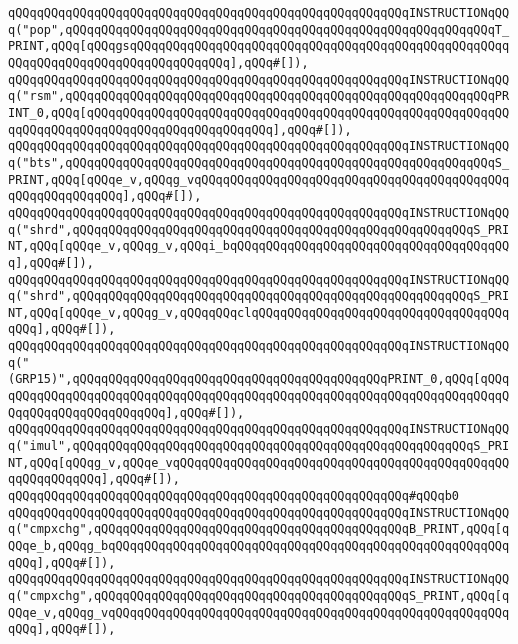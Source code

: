 \verb|qQQqqQQqqQQqqQQqqQQqqQQqqQQqqQQqqQQqqQQqqQQqqQQqqQQqqQQqINSTRUCTIONqQQq("pop",qQQqqQQqqQQqqQQqqQQqqQQqqQQqqQQqqQQqqQQqqQQqqQQqqQQqqQQqqQQqT_PRINT,qQQq[qQQqgsqQQqqQQqqQQqqQQqqQQqqQQqqQQqqQQqqQQqqQQqqQQqqQQqqQQqqQQqqQQqqQQqqQQqqQQqqQQqqQQqqQQq],qQQq#[]),|\newline
\verb|qQQqqQQqqQQqqQQqqQQqqQQqqQQqqQQqqQQqqQQqqQQqqQQqqQQqqQQqINSTRUCTIONqQQq("rsm",qQQqqQQqqQQqqQQqqQQqqQQqqQQqqQQqqQQqqQQqqQQqqQQqqQQqqQQqqQQqPRINT_0,qQQq[qQQqqQQqqQQqqQQqqQQqqQQqqQQqqQQqqQQqqQQqqQQqqQQqqQQqqQQqqQQqqQQqqQQqqQQqqQQqqQQqqQQqqQQqqQQqqQQq],qQQq#[]),|\newline
\verb|qQQqqQQqqQQqqQQqqQQqqQQqqQQqqQQqqQQqqQQqqQQqqQQqqQQqqQQqINSTRUCTIONqQQq("bts",qQQqqQQqqQQqqQQqqQQqqQQqqQQqqQQqqQQqqQQqqQQqqQQqqQQqqQQqqQQqS_PRINT,qQQq[qQQqe_v,qQQqg_vqQQqqQQqqQQqqQQqqQQqqQQqqQQqqQQqqQQqqQQqqQQqqQQqqQQqqQQqqQQq],qQQq#[]),|\newline
\verb|qQQqqQQqqQQqqQQqqQQqqQQqqQQqqQQqqQQqqQQqqQQqqQQqqQQqqQQqINSTRUCTIONqQQq("shrd",qQQqqQQqqQQqqQQqqQQqqQQqqQQqqQQqqQQqqQQqqQQqqQQqqQQqqQQqS_PRINT,qQQq[qQQqe_v,qQQqg_v,qQQqi_bqQQqqQQqqQQqqQQqqQQqqQQqqQQqqQQqqQQqqQQq],qQQq#[]),|\newline
\verb|qQQqqQQqqQQqqQQqqQQqqQQqqQQqqQQqqQQqqQQqqQQqqQQqqQQqqQQqINSTRUCTIONqQQq("shrd",qQQqqQQqqQQqqQQqqQQqqQQqqQQqqQQqqQQqqQQqqQQqqQQqqQQqqQQqS_PRINT,qQQq[qQQqe_v,qQQqg_v,qQQqqQQqclqQQqqQQqqQQqqQQqqQQqqQQqqQQqqQQqqQQqqQQq],qQQq#[]),|\newline
\verb|qQQqqQQqqQQqqQQqqQQqqQQqqQQqqQQqqQQqqQQqqQQqqQQqqQQqqQQqINSTRUCTIONqQQq("(GRP15)",qQQqqQQqqQQqqQQqqQQqqQQqqQQqqQQqqQQqqQQqqQQqPRINT_0,qQQq[qQQqqQQqqQQqqQQqqQQqqQQqqQQqqQQqqQQqqQQqqQQqqQQqqQQqqQQqqQQqqQQqqQQqqQQqqQQqqQQqqQQqqQQqqQQqqQQq],qQQq#[]),|\newline
\verb|qQQqqQQqqQQqqQQqqQQqqQQqqQQqqQQqqQQqqQQqqQQqqQQqqQQqqQQqINSTRUCTIONqQQq("imul",qQQqqQQqqQQqqQQqqQQqqQQqqQQqqQQqqQQqqQQqqQQqqQQqqQQqqQQqS_PRINT,qQQq[qQQqg_v,qQQqe_vqQQqqQQqqQQqqQQqqQQqqQQqqQQqqQQqqQQqqQQqqQQqqQQqqQQqqQQqqQQq],qQQq#[]),|\newline
\verb|qQQqqQQqqQQqqQQqqQQqqQQqqQQqqQQqqQQqqQQqqQQqqQQqqQQqqQQq#qQQqb0|\newline
\verb|qQQqqQQqqQQqqQQqqQQqqQQqqQQqqQQqqQQqqQQqqQQqqQQqqQQqqQQqINSTRUCTIONqQQq("cmpxchg",qQQqqQQqqQQqqQQqqQQqqQQqqQQqqQQqqQQqqQQqqQQqB_PRINT,qQQq[qQQqe_b,qQQqg_bqQQqqQQqqQQqqQQqqQQqqQQqqQQqqQQqqQQqqQQqqQQqqQQqqQQqqQQqqQQq],qQQq#[]),|\newline
\verb|qQQqqQQqqQQqqQQqqQQqqQQqqQQqqQQqqQQqqQQqqQQqqQQqqQQqqQQqINSTRUCTIONqQQq("cmpxchg",qQQqqQQqqQQqqQQqqQQqqQQqqQQqqQQqqQQqqQQqqQQqS_PRINT,qQQq[qQQqe_v,qQQqg_vqQQqqQQqqQQqqQQqqQQqqQQqqQQqqQQqqQQqqQQqqQQqqQQqqQQqqQQqqQQq],qQQq#[]),|\newline
